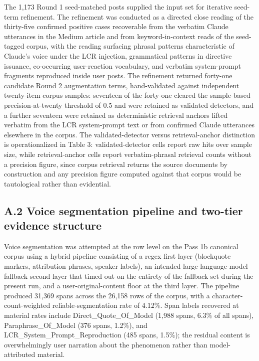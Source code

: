 \documentclass[11pt]{article}
\begin{document}
The 1,173 Round 1 seed-matched posts supplied the input set for iterative seed-term refinement. The refinement was conducted as a directed close reading of the thirty-five confirmed positive cases recoverable from the verbatim Claude utterances in the Medium article and from keyword-in-context reads of the seed-tagged corpus, with the reading surfacing phrasal patterns characteristic of Claude's voice under the LCR injection, grammatical patterns in directive issuance, co-occurring user-reaction vocabulary, and verbatim system-prompt fragments reproduced inside user posts. The refinement returned forty-one candidate Round 2 augmentation terms, hand-validated against independent twenty-item corpus samples: seventeen of the forty-one cleared the sample-based precision-at-twenty threshold of 0.5 and were retained as validated detectors, and a further seventeen were retained as deterministic retrieval anchors lifted verbatim from the LCR system-prompt text or from confirmed Claude utterances elsewhere in the corpus. The validated-detector versus retrieval-anchor distinction is operationalized in Table 3: validated-detector cells report raw hits over sample size, while retrieval-anchor cells report verbatim-phrasal retrieval counts without a precision figure, since corpus retrieval returns the source documents by construction and any precision figure computed against that corpus would be tautological rather than evidential.

\setcounter{table}{2}%


\subsection*{A.2 Voice segmentation pipeline and two-tier evidence structure}

Voice segmentation was attempted at the row level on the Pass 1b canonical corpus using a hybrid pipeline consisting of a regex first layer (blockquote markers, attribution phrases, speaker labels), an intended large-language-model fallback second layer that timed out on the entirety of the fallback set during the present run, and a user-original-content floor at the third layer. The pipeline produced 31,369 spans across the 26,158 rows of the corpus, with a character-count-weighted reliable-segmentation rate of 4.12\%. Span labels recovered at material rates include Direct\_Quote\_Of\_Model (1,988 spans, 6.3\% of all spans), Paraphrase\_Of\_Model (376 spans, 1.2\%), and LCR\_System\_Prompt\_Reproduction (485 spans, 1.5\%); the residual content is overwhelmingly user narration about the phenomenon rather than model-attributed material.
\end{document}
